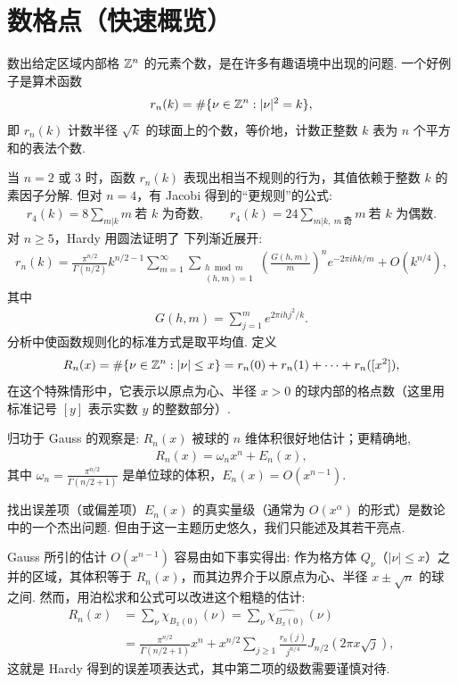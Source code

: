 \section{数格点（快速概览）}

数出给定区域内部格 $\mathbb{Z}^n$ 的元素个数，是在许多有趣语境中出现的问题. 一个好例子是算术函数
\begin{align*}
  r_{n}(k)=\#\{\nu\in\mathbb{Z}^{n}:|\nu|^{2}=k\},
\end{align*}
即 $r_n(k)$ 计数半径 $\sqrt{k}$ 的球面上的个数，等价地，计数正整数 $k$ 表为 $n$ 个平方和的表法个数.

当 $n = 2$ 或 $3$ 时，函数 $r_n(k)$ 表现出相当不规则的行为，其值依赖于整数 $k$ 的素因子分解. 但对 $n = 4$，有 Jacobi 得到的``更规则''的公式:
\begin{align*}
  r_{4}(k)=8\sum_{m|k}m\ \text{若 } k \text{ 为奇数},\qquad
  r_{4}(k)=24\sum_{m|k,\ m\ \text{奇}}m\ \text{若 } k \text{ 为偶数}.
\end{align*}
对 $n \geq 5$，Hardy 用圆法证明了 \cite{b162} 下列渐近展开:
\begin{align*}
  r_{n}(k)=\frac{\pi^{n/2}}{\Gamma(n/2)}k^{n/2-1}
  \sum_{m=1}^{\infty}\sum_{\substack{h\bmod m\\ (h,m)=1}}
  \left(\frac{G(h,m)}{m}\right)^{n}e^{-2\pi i h k/m}+O(k^{n/4}),
\end{align*}
其中
\begin{align*}
  G(h,m)=\sum_{j=1}^{m}e^{2\pi i h j^{2}/k}.
\end{align*}
分析中使函数规则化的标准方式是取平均值. 定义
\begin{align*}
  R_{n}(x)=\#\{\nu\in\mathbb{Z}^{n}:|\nu|\leq x\}=r_{n}(0)+r_{n}(1)+\cdots+r_{n}([x^{2}]),
\end{align*}
在这个特殊情形中，它表示以原点为心、半径 $x > 0$ 的球内部的格点数（这里用标准记号 $[y]$ 表示实数 $y$ 的整数部分）.

归功于 Gauss 的观察是: $R_{n}(x)$ 被球的 $n$ 维体积很好地估计；更精确地,
\begin{align*}
  R_{n}(x)=\omega_{n}x^{n}+E_{n}(x),
\end{align*}
其中 $\omega_{n}=\frac{\pi^{n/2}}{\Gamma(n/2+1)}$ 是单位球的体积，$E_{n}(x)=O(x^{n-1})$.

找出误差项（或偏差项）$E_n(x)$ 的真实量级（通常为 $O(x^{\alpha})$ 的形式）是数论中的一个杰出问题. 但由于这一主题历史悠久，我们只能述及其若干亮点.

Gauss 所引的估计 $O(x^{n-1})$ 容易由如下事实得出: 作为格方体 $Q_{\nu}$（$|\nu| \leq x$）之并的区域，其体积等于 $R_n(x)$，而其边界介于以原点为心、半径 $x \pm \sqrt{n}$ 的球之间. 然而，用泊松求和公式可以改进这个粗糙的估计:
\begin{align*}
  R_{n}(x)
  &=\sum_{\nu}\chi_{B_{x}(0)}(\nu)
  =\sum_{\nu}\widehat{\chi_{B_{x}(0)}}(\nu)\\
  &=\frac{\pi^{n/2}}{\Gamma(n/2+1)}x^{n}
   +x^{n/2}\sum_{j\geq 1}\frac{r_{n}(j)}{j^{n/4}}J_{n/2}(2\pi x\sqrt{j}),
\end{align*}
这就是 Hardy 得到的误差项表达式，其中第二项的级数需要谨慎对待.

